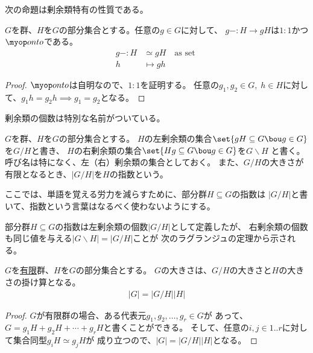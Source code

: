 	次の命題は剰余類特有の性質である。

	\begin{definition}[剰余類の大きさ]\label{def:剰余類の大きさ} %
		$G$を群、$H$を$G$の部分集合とする。任意の$g\in G$に対して、
		$g-:H\to gH$は$1:1$かつ$\onto$である。
		\begin{equation*}\begin{split}
			g-:H &\simeq gH \quad\text{as set } \\
			h &\mapsto gh
		\end{split}\end{equation*}
	\end{definition} %
	\begin{proof} $\onto$は自明なので、$1:1$を証明する。
	任意の$g_1,g_2\in G,\;h\in H$に対して、$g_1h=g_2h\implies g_1=g_2$となる。
	\end{proof}

	剰余類の個数は特別な名前がついている。

	\begin{definition}\label{def:部分群の指数} %
		$G$を群、$H$を$G$の部分集合とする。
		$H$の左剰余類の集合$\set{gH\subseteq G\bou g\in G}$を$G/H$と書き、
		$H$の右剰余類の集合$\set{Hg\subseteq G\bou g\in G}$を$G\backslash H$
		と書く。呼び名は特になく、左（右）剰余類の集合としておく。
		また、$G/H$の大きさが有限となるとき、$|G/H|$を$H$の指数という。
	\end{definition} %

	ここでは、単語を覚える労力を減らすために、部分群$H\subseteq G$の指数は
	$|G/H|$と書いて、指数という言葉はなるべく使わないようにする。

	部分群$H\subseteq G$の指数は左剰余類の個数$|G/H|$として定義したが、
	右剰余類の個数も同じ値を与える$|G\backslash H|=|G/H|$ことが
	次のラグランジュの定理から示される。

	\begin{proposition}[ラグランジュの定理]\label{prop:ラグランジュの定理} %
		$G$を\underline{有限}群、$H$を$G$の部分集合とする。
		$G$の大きさは、$G/H$の大きさと$H$の大きさの掛け算となる。
		\begin{equation*}\begin{split} %
			|G| = |G/H||H|
		\end{split}\end{equation*} %
	\end{proposition} %
	\begin{proof} $G$が有限群の場合、ある代表元$g_1,g_2,\dots,g_r\in G$が
	あって、$G=g_1H + g_2H + \cdots + g_rH$と書くことができる。
	そして、任意の$i,j\in1..r$に対して集合同型$g_iH\simeq g_jH$が
	成り立つので、$|G|=|G/H||H|$となる。
	\end{proof}

